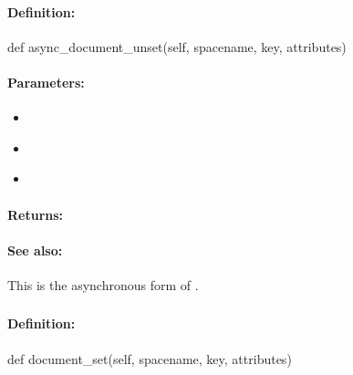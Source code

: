 \paragraph{Definition:}
\begin{pythoncode}
def async_document_unset(self, spacename, key, attributes)
\end{pythoncode}

\paragraph{Parameters:}
\begin{itemize}[noitemsep]
\item {}\\

\item {}\\

\item {}\\

\end{itemize}

\paragraph{Returns:}


\paragraph{See also:}  This is the asynchronous form of .

\pagebreak
\subsubsection{}
\label{api:python:document_set}


\paragraph{Definition:}
\begin{pythoncode}
def document_set(self, spacename, key, attributes)
\end{pythoncode}

